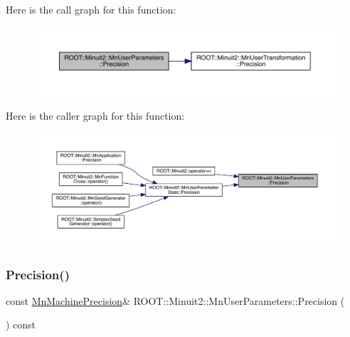 Here is the call graph for this function\+:
\nopagebreak
\begin{figure}[H]
\begin{center}
\leavevmode
\includegraphics[width=350pt]{d6/d10/classROOT_1_1Minuit2_1_1MnUserParameters_a52f62fcd0d9d9f6e907b07cc0194f547_cgraph}
\end{center}
\end{figure}
Here is the caller graph for this function\+:
\nopagebreak
\begin{figure}[H]
\begin{center}
\leavevmode
\includegraphics[width=350pt]{d6/d10/classROOT_1_1Minuit2_1_1MnUserParameters_a52f62fcd0d9d9f6e907b07cc0194f547_icgraph}
\end{center}
\end{figure}
\mbox{\label{classROOT_1_1Minuit2_1_1MnUserParameters_ac10a27293b367e8b74016e625a90b661}} 
\subsubsection{\texorpdfstring{Precision()}{Precision()}\hspace{0.1cm}{\footnotesize\ttfamily [2/3]}}
{\footnotesize\ttfamily const \mbox{\hyperlink{classROOT_1_1Minuit2_1_1MnMachinePrecision}{Mn\+Machine\+Precision}}\& R\+O\+O\+T\+::\+Minuit2\+::\+Mn\+User\+Parameters\+::\+Precision (\begin{DoxyParamCaption}{ }\end{DoxyParamCaption}) const}

